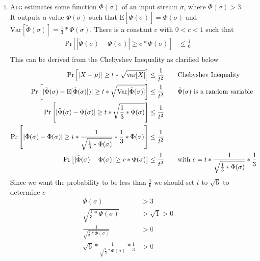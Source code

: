 \begin{enumerate}[(i)]
	\item
\textsc{Alg} estimates some function $\Phi(\sigma)$ of an input stream $\sigma$, where $\Phi(\sigma) > 3$. It outputs a value $\tilde{\Phi}(\sigma)$ such that $\text{E}[\tilde{\Phi}(\sigma)] = \Phi(\sigma)$ and $\text{Var}[\tilde{\Phi}(\sigma)] = \frac{1}{3} * \Phi(\sigma)$. 
There is a constant $c$ with $0 < c < 1$ such that
\[
\begin{split}
\text{Pr}[|\tilde{\Phi}(\sigma) - \Phi(\sigma)| \geq c * \Phi(\sigma)] &\leq \frac{1}{6}\\
\end{split}
\]
This can be derived from the Chebyshev Inequality as clarified below
\[
\begin{split}
\text{Pr}\left[|X - \mu)| \geq t * \sqrt{\text{var}[X]}\right] \leq \frac{1}{t^2} & \hspace*{20px}\text{Chebyshev Inequality}\\
\text{Pr}\left[|\tilde{\Phi}(\sigma) - \text{E}[\tilde{\Phi}(\sigma)])| \geq t * \sqrt{\text{Var}[\tilde{\Phi}(\sigma)]}\right] \leq \frac{1}{t^2} & \hspace*{20px}\text{$\tilde{\Phi}(\sigma)$ is a random variable}\\
\text{Pr}\left[|\tilde{\Phi}(\sigma) - \Phi(\sigma)| \geq t * \sqrt{\frac{1}{3} * \Phi(\sigma)}\right] \leq \frac{1}{t^2} & \hspace*{20px}\text{}\\
\text{Pr}\left[|\tilde{\Phi}(\sigma) - \Phi(\sigma)| \geq t * \frac{1}{\sqrt{\frac{1}{3} * \Phi(\sigma)}} * \frac{1}{3} * \Phi(\sigma)\right] \leq \frac{1}{t^2} & \hspace*{20px}\text{}\\
\text{Pr}\left[|\tilde{\Phi}(\sigma) - \Phi(\sigma)| \geq c * \Phi(\sigma)\right] \leq \frac{1}{t^2} & \hspace*{20px}\text{with $c = t * \frac{1}{\sqrt{\frac{1}{3} * \Phi(\sigma)}} * \frac{1}{3}$}\\
\end{split}
\]
Since we want the probability to be less than $\frac{1}{6}$ we should set $t$ to $\sqrt{6}$ to determine $c$
\[
\begin{split}
\Phi(\sigma) &> 3\\
\sqrt{\frac{1}{3} * \Phi(\sigma)} &> \sqrt{1} > 0\\
\frac{1}{\sqrt{\frac{1}{3} * \Phi(\sigma)}} &> 0\\
\sqrt{6} * \frac{1}{\sqrt{\frac{1}{3} * \Phi(\sigma)}} * \frac{1}{3} &> 0 \\

\end{split}\]
\end{enumerate}
